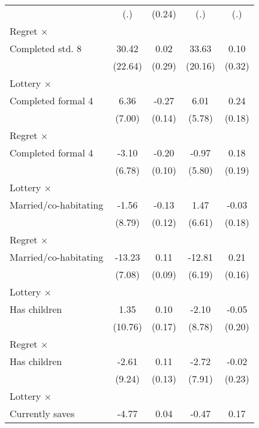 \begin{table}[htbp]
\begin{tabular}{l*{4}{c}}
                &      (.)         &   (0.24)         &      (.)         &      (.)         \\
\addlinespace
Regret $\times$ \\ Completed std. 8&    30.42         &     0.02         &    33.63\sym{*}  &     0.10         \\
                &  (22.64)         &   (0.29)         &  (20.16)         &   (0.32)         \\
\addlinespace
Lottery $\times$ \\ Completed formal 4&     6.36         &    -0.27\sym{*}  &     6.01         &     0.24         \\
                &   (7.00)         &   (0.14)         &   (5.78)         &   (0.18)         \\
\addlinespace
Regret $\times$ \\ Completed formal 4&    -3.10         &    -0.20\sym{*}  &    -0.97         &     0.18         \\
                &   (6.78)         &   (0.10)         &   (5.80)         &   (0.19)         \\
\addlinespace
Lottery $\times$ \\ Married/co-habitating&    -1.56         &    -0.13         &     1.47         &    -0.03         \\
                &   (8.79)         &   (0.12)         &   (6.61)         &   (0.18)         \\
\addlinespace
Regret $\times$ \\ Married/co-habitating&   -13.23\sym{*}  &     0.11         &   -12.81\sym{**} &     0.21         \\
                &   (7.08)         &   (0.09)         &   (6.19)         &   (0.16)         \\
\addlinespace
Lottery $\times$ \\ Has children&     1.35         &     0.10         &    -2.10         &    -0.05         \\
                &  (10.76)         &   (0.17)         &   (8.78)         &   (0.20)         \\
\addlinespace
Regret $\times$ \\ Has children&    -2.61         &     0.11         &    -2.72         &    -0.02         \\
                &   (9.24)         &   (0.13)         &   (7.91)         &   (0.23)         \\
\addlinespace
Lottery $\times$ \\ Currently saves&    -4.77         &     0.04         &    -0.47         &     0.17         \\

\end{tabular}
\end{table}
